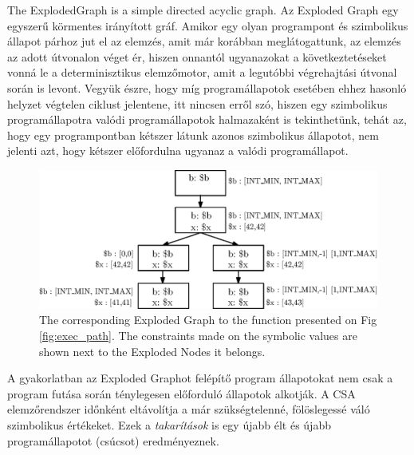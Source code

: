 \documentclass[oneside, a4paper, 12pt]{article}
\theoremstyle{definition}
\begin{document}
The ExplodedGraph is a simple directed acyclic graph.
Az Exploded Graph egy egyszerű körmentes irányított gráf. Amikor egy olyan 
programpont és szimbolikus
állapot párhoz jut el az elemzés, amit már korábban meglátogattunk, az elemzés
az adott útvonalon véget ér, hiszen onnantól ugyanazokat a
következtetéseket vonná le a determinisztikus elemzőmotor, amit a legutóbbi 
végrehajtási útvonal során is levont.
Vegyük észre, hogy míg programállapotok
esetében ehhez hasonló helyzet végtelen ciklust jelentene, itt nincsen erről 
szó,
hiszen egy szimbolikus programállapotra valódi programállapotok halmazaként is 
tekinthetünk, tehát az,
hogy egy programpontban kétszer látunk azonos szimbolikus állapotot, nem 
jelenti azt, hogy kétszer előfordulna ugyanaz a valódi programállapot.

\begin{figure}[h]
	\centering
	\includegraphics[width=1\textwidth]{img/explodedgraph.eps}
	\caption{The corresponding Exploded Graph to the function presented on Fig 
	\ref{fig:exec_path}. The constraints made on the symbolic values are shown 
	next to the Exploded Nodes it belongs.}
	\label{fig:exploded_graph}
\end{figure}

A gyakorlatban az Exploded Graphot felépítő program állapotokat nem csak a
program futása során ténylegesen előforduló állapotok alkotják. A CSA
elemzőrendszer időnként eltávolítja a már szükségtelenné, fölöslegessé váló
szimbolikus értékeket. Ezek a \textit{takarítások} is egy újabb élt és újabb
programállapotot (csúcsot) eredményeznek.
\end{document}
